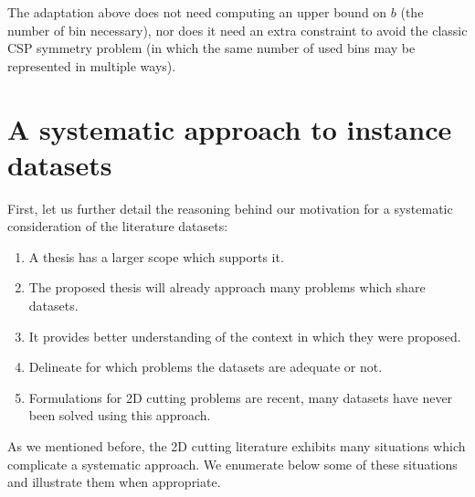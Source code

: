 The adaptation above does not need computing an upper bound on \(b\) (the number of bin necessary), nor does it need an extra constraint to avoid the classic CSP symmetry problem (in which the same number of used bins may be represented in multiple ways).

\section{A systematic approach to instance datasets}

First, let us further detail the reasoning behind our motivation for a systematic consideration of the literature datasets:

\begin{enumerate}
\item A thesis has a larger scope which supports it.
\item The proposed thesis will already approach many problems which share datasets.
\item It provides better understanding of the context in which they were proposed.
\item Delineate for which problems the datasets are adequate or not.
\item Formulations for 2D cutting problems are recent, many datasets have never been solved using this approach.
\end{enumerate}

As we mentioned before, the 2D cutting literature exhibits many situations which complicate a systematic approach.
We enumerate below some of these situations and illustrate them when appropriate.


